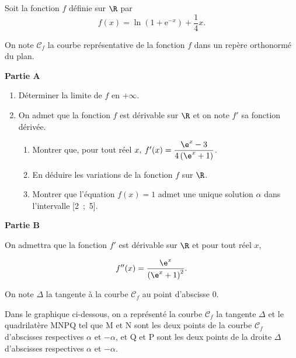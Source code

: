 \medskip

Soit la fonction $f$ définie sur $\R$ par 
\[f(x) = \ln \left(1 + \text{e}^{-x}\right) + \dfrac14 x.\]

On note $\mathcal{C}_f$ la courbe représentative de la fonction $f$ dans un repère orthonormé \Oij{} du plan.

\medskip

\textbf{Partie A}

\medskip

\begin{enumerate}
\item Déterminer la limite de $f$ en $+ \infty$.
\item On admet que la fonction $f$ est dérivable sur $\R$ et on note $f'$ sa fonction dérivée.
	\begin{enumerate}
		\item Montrer que, pour tout réel $x,\: f'(x) = \dfrac{\e^x - 3}{4\left(\e^x + 1\right)}$.
		\item En déduire les variations de la fonction $f$ sur $\R$.
		\item Montrer que l'équation $f(x) = 1$ admet une unique solution $\alpha$ dans l'intervalle [2~;~5].
	\end{enumerate}
\end{enumerate}

\medskip

\textbf{Partie B}

\medskip

On admettra que la fonction $f'$ est dérivable sur $\R$ et pour tout réel $x$,

\[f''(x) = \dfrac{\e^x}{\left(\e^x + 1\right)^2}.\]

On note $\Delta$ la tangente à la courbe $\mathcal{C}_f$ au point d'abscisse $0$.

Dans le graphique ci-dessous, on a représenté la courbe $\mathcal{C}_f$ la tangente $\Delta$ et le quadrilatère MNPQ tel que M et N sont les deux points de la courbe $\mathcal{C}_f$ d'abscisses respectives $\alpha$ et $- \alpha$, et Q et P sont les deux points de la droite $\Delta$ d'abscisses respectives $\alpha$ et $- \alpha$.


